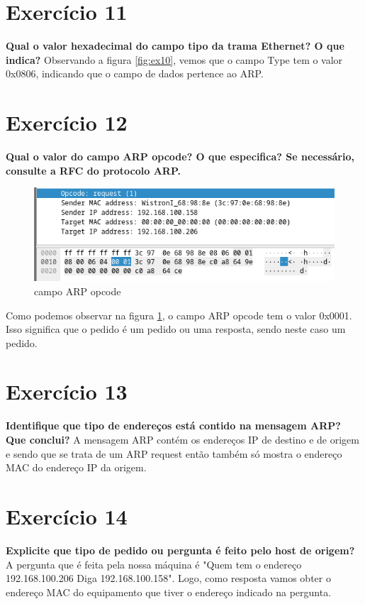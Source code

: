 \documentclass[a4paper]{report}
\begin{document}
\section{Exercício 11}
\textbf{Qual o valor hexadecimal do campo tipo da trama Ethernet? O que indica?}
Observando a figura \ref{fig:ex10}, vemos que o campo Type tem o valor 0x0806, 
indicando que o campo de dados pertence ao ARP.

\section{Exercício 12}
\textbf{Qual o valor do campo ARP opcode? O que especifica?  Se necessário,
consulte a RFC do protocolo ARP.}

\begin{figure}[H]
    \centering 
    \includegraphics[width=\textwidth]{images/ex12.png}
    \caption{campo ARP opcode}
    \label{fig:ex12}
\end{figure}
Como podemos observar na figura \ref{fig:ex12}, o campo ARP opcode tem o valor
0x0001. Isso significa que o pedido é um pedido ou uma resposta, sendo neste
caso um pedido.

\section{Exercício 13}
\textbf{Identifique que tipo de endereços está contido na mensagem ARP? Que
conclui?}
A mensagem ARP contém os endereços IP de destino e de origem e sendo que se
trata de um ARP request então também só mostra o endereço MAC do endereço IP da
origem.

\section{Exercício 14}
\textbf{Explicite que tipo de pedido ou pergunta é feito pelo host de origem?}
A pergunta que é feita pela nossa máquina é "Quem tem o endereço 192.168.100.206
Diga 192.168.100.158". Logo, como resposta vamos obter o endereço MAC do
equipamento que tiver o endereço indicado na pergunta.
\end{document}

